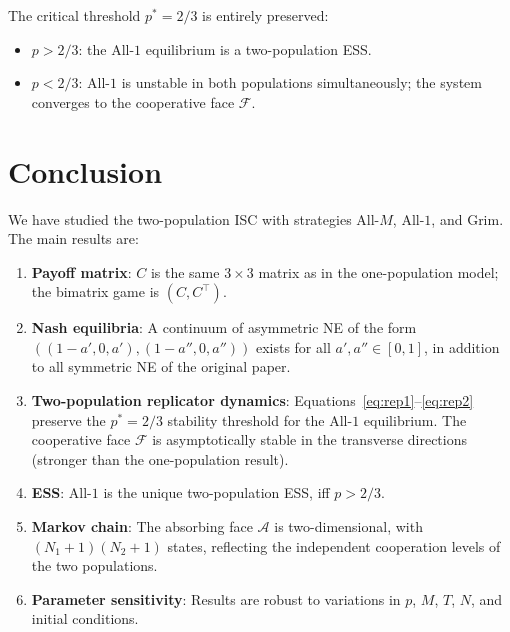 \documentclass[12pt,a4paper]{article}
\begin{document}
The critical threshold $p^*=2/3$ is entirely preserved:
\begin{itemize}
  \item $p>2/3$: the All-$1$ equilibrium is a two-population ESS.
  \item $p<2/3$: All-$1$ is unstable in both populations simultaneously;
        the system converges to the cooperative face $\mathcal{F}$.
\end{itemize}

\section{Conclusion}
\label{sec:conc}

We have studied the two-population ISC with strategies All-$M$, All-$1$, and
Grim.  The main results are:

\begin{enumerate}
  \item \textbf{Payoff matrix}: $C$ is the same $3\times3$ matrix as in the
        one-population model; the bimatrix game is $(C,C^\top)$.
  \item \textbf{Nash equilibria}: A continuum of asymmetric NE of the form
        $((1-a',0,a'),(1-a'',0,a''))$ exists for all $a',a''\in[0,1]$, in
        addition to all symmetric NE of the original paper.
  \item \textbf{Two-population replicator dynamics}: Equations~\eqref{eq:rep1}--\eqref{eq:rep2}
        preserve the $p^*=2/3$ stability threshold for the All-$1$ equilibrium.
        The cooperative face $\mathcal{F}$ is asymptotically stable in the
        transverse directions (stronger than the one-population result).
  \item \textbf{ESS}: All-$1$ is the unique two-population ESS, iff $p>2/3$.
  \item \textbf{Markov chain}: The absorbing face $\mathcal{A}$ is
        two-dimensional, with $(N_1+1)(N_2+1)$ states, reflecting the
        independent cooperation levels of the two populations.
  \item \textbf{Parameter sensitivity}: Results are robust to variations in
        $p$, $M$, $T$, $N$, and initial conditions.
\end{enumerate}
\end{document}
